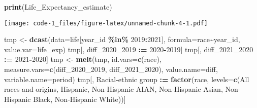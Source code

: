 \documentclass[
]{article}
\newenvironment{Shaded}{\begin{snugshade}}{\end{snugshade}}
\newcommand{\AttributeTok}[1]{\textcolor[rgb]{0.13,0.29,0.53}{#1}}
\newcommand{\DecValTok}[1]{\textcolor[rgb]{0.00,0.00,0.81}{#1}}
\newcommand{\FunctionTok}[1]{\textcolor[rgb]{0.13,0.29,0.53}{\textbf{#1}}}
\newcommand{\NormalTok}[1]{#1}
\newcommand{\OtherTok}[1]{\textcolor[rgb]{0.56,0.35,0.01}{#1}}
\newcommand{\SpecialCharTok}[1]{\textcolor[rgb]{0.81,0.36,0.00}{\textbf{#1}}}
\newcommand{\StringTok}[1]{\textcolor[rgb]{0.31,0.60,0.02}{#1}}
\begin{document}
\begin{Shaded}
\begin{Highlighting}[]
\FunctionTok{print}\NormalTok{(Life\_Expectancy\_estimate)}
\end{Highlighting}
\end{Shaded}

\texttt{[image: code-1\_files/figure-latex/unnamed-chunk-4-1.pdf]}

\begin{Shaded}
\begin{Highlighting}[]
\NormalTok{tmp }\OtherTok{\textless{}{-}} \FunctionTok{dcast}\NormalTok{(}\AttributeTok{data=}\NormalTok{life[year\_id }\SpecialCharTok{\%in\%} \DecValTok{2019}\SpecialCharTok{:}\DecValTok{2021}\NormalTok{], }\AttributeTok{formula=}\NormalTok{race}\SpecialCharTok{\textasciitilde{}}\NormalTok{year\_id, }\AttributeTok{value.var=}\StringTok{\textquotesingle{}life\_exp\textquotesingle{}}\NormalTok{)}
\NormalTok{tmp[, diff\_2020\_2019 }\SpecialCharTok{:=} \StringTok{\textasciigrave{}}\AttributeTok{2020}\StringTok{\textasciigrave{}}\SpecialCharTok{{-}}\StringTok{\textasciigrave{}}\AttributeTok{2019}\StringTok{\textasciigrave{}}\NormalTok{]}
\NormalTok{tmp[, diff\_2021\_2020 }\SpecialCharTok{:=} \StringTok{\textasciigrave{}}\AttributeTok{2021}\StringTok{\textasciigrave{}}\SpecialCharTok{{-}}\StringTok{\textasciigrave{}}\AttributeTok{2020}\StringTok{\textasciigrave{}}\NormalTok{]}
\NormalTok{tmp }\OtherTok{\textless{}{-}} \FunctionTok{melt}\NormalTok{(tmp, }\AttributeTok{id.vars=}\FunctionTok{c}\NormalTok{(}\StringTok{\textquotesingle{}race\textquotesingle{}}\NormalTok{), }\AttributeTok{measure.vars=}\FunctionTok{c}\NormalTok{(}\StringTok{\textquotesingle{}diff\_2020\_2019\textquotesingle{}}\NormalTok{, }\StringTok{\textquotesingle{}diff\_2021\_2020\textquotesingle{}}\NormalTok{), }\AttributeTok{value.name=}\StringTok{\textquotesingle{}diff\textquotesingle{}}\NormalTok{, }\AttributeTok{variable.name=}\StringTok{\textquotesingle{}period\textquotesingle{}}\NormalTok{)}
\NormalTok{tmp[, }\StringTok{\textasciigrave{}}\AttributeTok{Racial{-}ethnic group}\StringTok{\textasciigrave{}} \SpecialCharTok{:=} \FunctionTok{factor}\NormalTok{(race, }\AttributeTok{levels=}\FunctionTok{c}\NormalTok{(}\StringTok{\textquotesingle{}All races and origins\textquotesingle{}}\NormalTok{, }\StringTok{\textquotesingle{}Hispanic\textquotesingle{}}\NormalTok{, }\StringTok{\textquotesingle{}Non{-}Hispanic AIAN\textquotesingle{}}\NormalTok{, }\StringTok{\textquotesingle{}Non{-}Hispanic Asian\textquotesingle{}}\NormalTok{, }\StringTok{\textquotesingle{}Non{-}Hispanic Black\textquotesingle{}}\NormalTok{, }\StringTok{\textquotesingle{}Non{-}Hispanic White\textquotesingle{}}\NormalTok{))]}


\end{Highlighting}
\end{Shaded}
\end{document}
